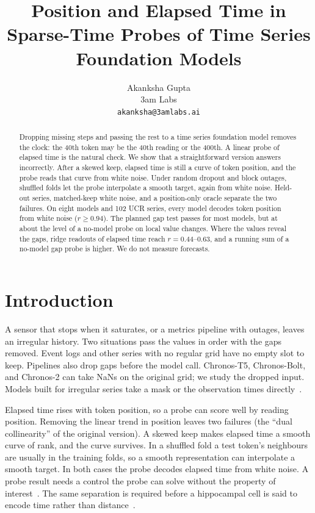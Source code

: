 \documentclass{article}
\title{Position and Elapsed Time in Sparse-Time Probes of Time Series Foundation Models}
\author{%
  Akanksha Gupta\\
  3am Labs\\
  \texttt{akanksha@3amlabs.ai}
}
\begin{document}
\maketitle

\begin{abstract}
Dropping missing steps and passing the rest to a time series foundation model removes the clock: the 40th token may be the 40th reading or the 400th.
A linear probe of elapsed time is the natural check.
We show that a straightforward version answers incorrectly.
After a skewed keep, elapsed time is still a curve of token position, and the probe reads that curve from white noise.
Under random dropout and block outages, shuffled folds let the probe interpolate a smooth target, again from white noise.
Held-out series, matched-keep white noise, and a position-only oracle separate the two failures.
On eight models and 102 UCR series, every model decodes token position from white noise ($r \ge 0.94$).
The planned gap test passes for most models, but at about the level of a no-model probe on local value changes.
Where the values reveal the gaps, ridge readouts of elapsed time reach $r = 0.44$--$0.63$, and a running sum of a no-model gap probe is higher.
We do not measure forecasts.
\end{abstract}

\section{Introduction}
\label{sec:intro}

A sensor that stops when it saturates, or a metrics pipeline with outages, leaves an irregular history.
Two situations pass the values in order with the gaps removed.
Event logs and other series with no regular grid have no empty slot to keep.
Pipelines also drop gaps before the model call.
Chronos-T5, Chronos-Bolt, and Chronos-2 can take NaNs on the original grid; we study the dropped input.
Models built for irregular series take a mask or the observation times directly~\citep{che2018grud,rubanova2019latent,kidger2020ncde,shukla2021mtan}.

Elapsed time rises with token position, so a probe can score well by reading position.
Removing the linear trend in position leaves two failures (the ``dual collinearity'' of the original version).
A skewed keep makes elapsed time a smooth curve of rank, and the curve survives.
In a shuffled fold a test token's neighbours are usually in the training folds, so a smooth representation can interpolate a smooth target.
In both cases the probe decodes elapsed time from white noise.
A probe result needs a control the probe can solve without the property of interest~\citep{hewitt2019control}.
The same separation is required before a hippocampal cell is said to encode time rather than distance~\citep{kraus2013time}.
\end{document}
